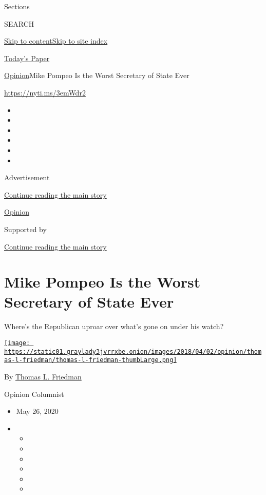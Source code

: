 Sections

SEARCH

\protect\hyperlink{site-content}{Skip to
content}\protect\hyperlink{site-index}{Skip to site index}

\href{https://myaccount.nytimes3xbfgragh.onion/auth/login?response_type=cookie\&client_id=vi}{}

\href{https://www.nytimes3xbfgragh.onion/section/todayspaper}{Today's
Paper}

\href{/section/opinion}{Opinion}\textbar{}Mike Pompeo Is the Worst
Secretary of State Ever

\url{https://nyti.ms/3emWdr2}

\begin{itemize}
\item
\item
\item
\item
\item
\item
\end{itemize}

Advertisement

\protect\hyperlink{after-top}{Continue reading the main story}

\href{/section/opinion}{Opinion}

Supported by

\protect\hyperlink{after-sponsor}{Continue reading the main story}

\hypertarget{mike-pompeo-is-the-worst-secretary-of-state-ever}{%
\section{Mike Pompeo Is the Worst Secretary of State
Ever}\label{mike-pompeo-is-the-worst-secretary-of-state-ever}}

Where's the Republican uproar over what's gone on under his watch?

\href{https://www.nytimes3xbfgragh.onion/by/thomas-l-friedman}{\texttt{[image: https://static01.graylady3jvrrxbe.onion/images/2018/04/02/opinion/thomas-l-friedman/thomas-l-friedman-thumbLarge.png]}}

By \href{https://www.nytimes3xbfgragh.onion/by/thomas-l-friedman}{Thomas
L. Friedman}

Opinion Columnist

\begin{itemize}
\item
  May 26, 2020
\item
  \begin{itemize}
  \item
  \item
  \item
  \item
  \item
  \item
  \end{itemize}
\end{itemize}


